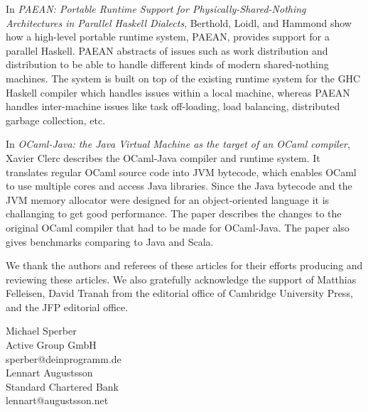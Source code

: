 \documentclass{jfp1}
\begin{document}
In \textit{PAEAN: Portable Runtime Support for Physically-Shared-Nothing Architectures in Parallel Haskell Dialects},
Berthold, Loidl, and Hammond show how a high-level portable runtime system, PAEAN, provides
support for a parallel Haskell.
PAEAN abstracts of issues such as work distribution and distribution to be able
to handle different kinds of modern shared-nothing machines.
The system is built on top of the existing runtime system for the GHC Haskell compiler
which handles issues within a local machine, whereas PAEAN handles inter-machine
issues like task off-loading, load balancing, distributed garbage collection, etc.

In \textit{OCaml-Java: the Java Virtual Machine as the target of an OCaml compiler},
Xavier Clerc describes the OCaml-Java compiler and runtime system.
It translates regular OCaml source code into JVM bytecode, which enables
OCaml to use multiple cores and access Java libraries.
Since the Java bytecode and the JVM memory allocator were designed for an object-oriented
language it is challanging to get good performance.
The paper describes the changes to the original OCaml compiler that had to be
made for OCaml-Java.  The paper also gives benchmarks comparing to Java and Scala.

We thank the authors and referees of these articles for their efforts
producing and reviewing these articles.  We also gratefully
acknowledge the support of Matthias Felleisen, David Tranah from the
editorial office of Cambridge University Press, and the JFP editorial
office.

\begin{flushright}
 Michael Sperber\\
  Active Group GmbH\\
  sperber@deinprogramm.de\\[2mm]
  Lennart Augustsson\\
  Standard Chartered Bank\\
  lennart@augustsson.net
\end{flushright}
\end{document}
